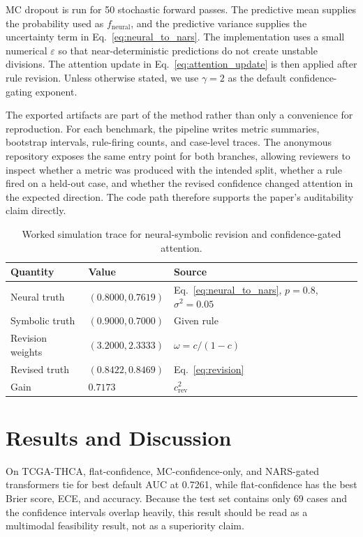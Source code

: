 \documentclass{article}
\begin{document}
MC dropout is run for 50 stochastic forward passes. The predictive mean supplies the probability used as $f_{\text{neural}}$, and the predictive variance supplies the uncertainty term in Eq.~\ref{eq:neural_to_nars}. The implementation uses a small numerical $\varepsilon$ so that near-deterministic predictions do not create unstable divisions. The attention update in Eq.~\ref{eq:attention_update} is then applied after rule revision. Unless otherwise stated, we use $\gamma=2$ as the default confidence-gating exponent.

The exported artifacts are part of the method rather than only a convenience for reproduction. For each benchmark, the pipeline writes metric summaries, bootstrap intervals, rule-firing counts, and case-level traces. The anonymous repository exposes the same entry point for both branches, allowing reviewers to inspect whether a metric was produced with the intended split, whether a rule fired on a held-out case, and whether the revised confidence changed attention in the expected direction. The code path therefore supports the paper's auditability claim directly.

\begin{table}[t]
\caption{Worked simulation trace for neural-symbolic revision and confidence-gated attention.}
\label{tab:simulation_trace}
\centering
\small
\setlength{\tabcolsep}{4pt}
\begin{tabular}{@{}lll@{}}
\toprule
Quantity & Value & Source \\
\midrule
Neural truth & $(0.8000,0.7619)$ & Eq.~\ref{eq:neural_to_nars}, $p=0.8$, $\sigma^2=0.05$ \\
Symbolic truth & $(0.9000,0.7000)$ & Given rule \\
Revision weights & $(3.2000,2.3333)$ & $\omega=c/(1-c)$ \\
Revised truth & $(0.8422,0.8469)$ & Eq.~\ref{eq:revision} \\
Gain & $0.7173$ & $c_{\text{rev}}^2$ \\
\bottomrule
\end{tabular}
\end{table}

\section{Results and Discussion}
\label{sec:results}

On TCGA-THCA, flat-confidence, MC-confidence-only, and NARS-gated transformers tie for best default AUC at 0.7261, while flat-confidence has the best Brier score, ECE, and accuracy. Because the test set contains only 69 cases and the confidence intervals overlap heavily, this result should be read as a multimodal feasibility result, not as a superiority claim.
\end{document}
